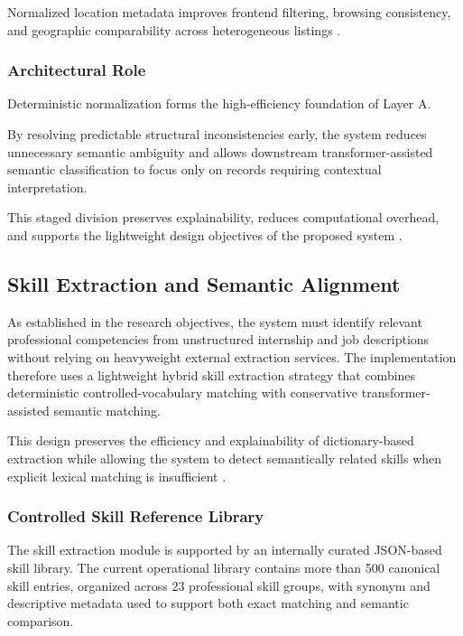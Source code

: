 Normalized location metadata improves frontend filtering, browsing consistency, and geographic comparability across heterogeneous listings \cite{batini2009methodologies}.

\subsubsection*{Architectural Role}

Deterministic normalization forms the high-efficiency foundation of Layer A.

By resolving predictable structural inconsistencies early, the system reduces unnecessary semantic ambiguity and allows downstream transformer-assisted semantic classification to focus only on records requiring contextual interpretation.

This staged division preserves explainability, reduces computational overhead, and supports the lightweight design objectives of the proposed system \cite{schwartz2020green, menghani2023efficient}.

\subsection{Skill Extraction and Semantic Alignment}

As established in the research objectives, the system must identify relevant professional competencies from unstructured internship and job descriptions without relying on heavyweight external extraction services. The implementation therefore uses a lightweight hybrid skill extraction strategy that combines deterministic controlled-vocabulary matching with conservative transformer-assisted semantic matching.

This design preserves the efficiency and explainability of dictionary-based extraction while allowing the system to detect semantically related skills when explicit lexical matching is insufficient \cite{pappas2022jobbert, schwartz2020green}.

\subsubsection*{Controlled Skill Reference Library}

The skill extraction module is supported by an internally curated JSON-based skill library. The current operational library contains more than 500 canonical skill entries, organized across 23 professional skill groups, with synonym and descriptive metadata used to support both exact matching and semantic comparison.

